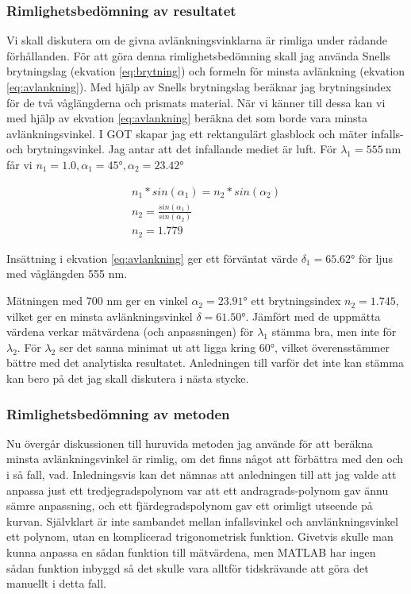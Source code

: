 \documentclass[a4paper]{article}
\begin{document}
\subsubsection{Rimlighetsbedömning av resultatet}
Vi skall diskutera om de givna avlänkningsvinklarna är rimliga under rådande förhållanden. För att göra denna rimlighetsbedömning skall
jag använda Snells brytningslag (ekvation \ref{eq:brytning}) och formeln för minsta avlänkning (ekvation \ref{eq:avlankning}). Med hjälp
av Snells brytningslag beräknar jag brytningsindex för de två våglängderna och prismats material. När vi känner till dessa kan vi med hjälp
av ekvation \ref{eq:avlankning} beräkna det som borde vara minsta avlänkningsvinkel. I GOT skapar jag ett rektangulärt glasblock och mäter
infalls- och brytningsvinkel. Jag antar att det infallande mediet är luft. För $\lambda_1=\SI{555}{\nano\meter}$ får vi $n_1 = 1.0, \alpha_1 = \ang{45}, \alpha_2 = \ang{23.42}$

\begin{equation}
    \begin{aligned}
        n_1 * sin(\alpha_1) = n_2 * sin(\alpha_2) \\
        n_2 = \frac{sin(\alpha_1)}{sin(\alpha_2)} \\
        n_2 = 1.779
    \end{aligned}
\end{equation}

Insättning i ekvation \ref{eq:avlankning} ger ett förväntat värde $\delta_1 = \ang{65.62}$ för ljus med våglängden 555 nm.

Mätningen med 700 nm ger en vinkel $\alpha_2 = \ang{23.91}$ ett brytningsindex $n_2 = 1.745$, vilket ger en minsta avlänkningsvinkel
$\delta = \ang{61.50}$. Jämfört med de uppmätta värdena verkar mätvärdena (och anpassningen) för $\lambda_1$ stämma bra,
men inte för $\lambda_2$. För $\lambda_2$ ser det sanna minimat ut att ligga kring \ang{60}, vilket överensstämmer bättre med det analytiska
resultatet. Anledningen till varför det inte kan stämma kan bero på det jag skall diskutera i nästa stycke.

\subsubsection{Rimlighetsbedömning av metoden}
Nu övergår diskussionen till huruvida metoden jag använde för att beräkna minsta avlänkningsvinkel är rimlig, om det finns något
att förbättra med den och i så fall, vad. Inledningsvis kan det nämnas att anledningen till att jag valde att anpassa just ett tredjegradspolynom
var att ett andragrads-polynom gav ännu sämre anpassning, och ett fjärdegradspolynom gav ett orimligt utseende på kurvan. Självklart är inte sambandet
mellan infallsvinkel och anvlänkningsvinkel ett polynom, utan en komplicerad trigonometrisk funktion. Givetvis skulle man kunna anpassa
en sådan funktion till mätvärdena, men MATLAB har ingen sådan funktion inbyggd så det skulle vara alltför tidskrävande att göra det manuellt i detta fall.
\end{document}
